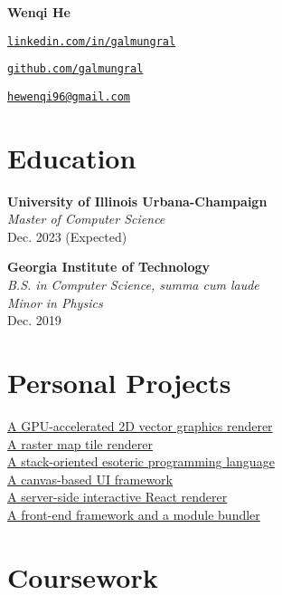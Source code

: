 \documentclass[11pt,twocolumn]{article}
\begin{document}
{\Huge\bf Wenqi He}

\vspace{10pt}
\href{https://linkedin.com/in/galmungral}{\texttt{linkedin.com/in/galmungral}}

\href{https://github.com/galmungral}{\texttt{github.com/galmungral}}

\href{mailto:hewenqi96@gmail.com}{\texttt{hewenqi96@gmail.com}}

\section*{\textsf{Education}}
\textbf{University of Illinois Urbana-Champaign}\\
\textit{Master of Computer Science}\\
Dec. 2023 (Expected)

\vspace{1em}
\textbf{Georgia Institute of Technology}\\
\textit{B.S. in Computer Science, summa cum laude}\\
\textit{Minor in Physics}\\
Dec. 2019

\section*{\textsf{Personal Projects}}

\href{https://github.com/galmungral/polyrender}{A GPU-accelerated 2D vector graphics renderer}\\
\href{https://github.com/galmungral/mercator}{A raster map tile renderer}\\
\href{https://github.com/galmungral/hanbun-lang}{A stack-oriented esoteric programming language} \\
\href{https://github.com/galmungral/michelangelo}{A canvas-based UI framework}\\
\href{https://github.com/galmungral/react-teletype}{A server-side interactive React renderer} \\
\href{https://github.com/galmungral/replay}{A front-end framework and a module bundler}

\section*{\textsf{Coursework}}
\end{document}
